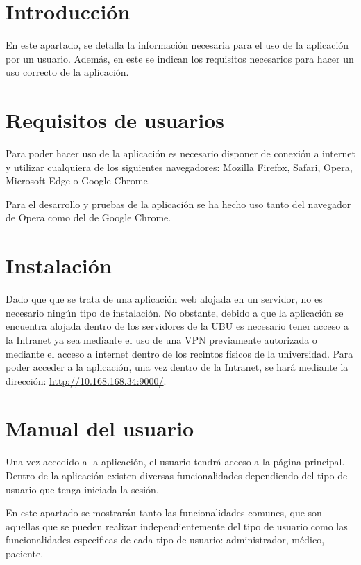 
\section{Introducción}

En este apartado, se detalla la información necesaria para el uso de la aplicación por un usuario. Además, en este se indican los requisitos necesarios para hacer un uso correcto de la aplicación.

\section{Requisitos de usuarios}

Para poder hacer uso de la aplicación es necesario disponer de conexión a internet y utilizar cualquiera de los siguientes navegadores: Mozilla Firefox, Safari, Opera, Microsoft Edge o Google Chrome.

Para el desarrollo y pruebas de la aplicación se ha hecho uso tanto del navegador de Opera como del de Google Chrome.


\section{Instalación}

Dado que que se trata de una aplicación web alojada en un servidor, no es necesario ningún tipo de instalación. No obstante, debido a que la aplicación se encuentra alojada dentro de los servidores de la UBU es necesario tener acceso a la Intranet ya sea mediante el uso de una VPN previamente autorizada o mediante el acceso a internet dentro de los recintos físicos de la universidad. Para poder acceder a la aplicación, una vez dentro de la Intranet, se hará mediante la dirección: \url{http://10.168.168.34:9000/}.

\section{Manual del usuario}

Una vez accedido a la aplicación, el usuario tendrá acceso a la página principal. Dentro de la aplicación existen diversas funcionalidades dependiendo del tipo de usuario que tenga iniciada la sesión.

En este apartado se mostrarán tanto las funcionalidades comunes, que son aquellas que se pueden realizar independientemente del tipo de usuario como las funcionalidades especificas de cada tipo de usuario: administrador, médico, paciente.

